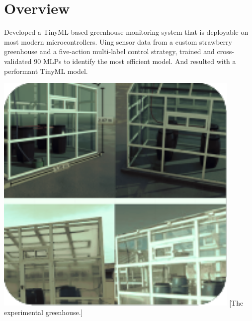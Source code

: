 \documentclass[../../main]{subfiles}
\begin{document}
\section{Overview} \label{sec:}

\begin{minipage} {0.62\textwidth}
    \vspace{-0.8cm}

    Developed a TinyML-based greenhouse monitoring system that is deployable on
    most modern microcontrollers. Uing sensor data from a custom strawberry greenhouse
    and a five-action multi-label control strategy, trained and cross-validated 90
    MLPs to identify the most efficient model. And resulted with a performant
    TinyML model.

\end{minipage}
\hfill
\begin{minipage} {0.35\textwidth}
    \begin{center}
        \vspace{-1.2cm}
        \includegraphics[width = 0.89\textwidth] {pics/microclimate.pdf}
        [The experimental greenhouse.]{}
        \label{fig:case2Pic}
    \end{center}
\end{minipage}
\end{document}
